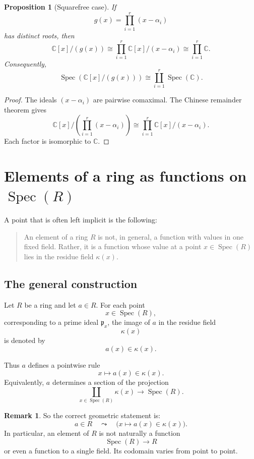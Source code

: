 \documentclass[11pt]{article}
\newtheorem{proposition}[theorem]{Proposition}
\theoremstyle{definition}
\newtheorem{remark}[theorem]{Remark}
\newcommand{\C}{\mathbb{C}}
\newcommand{\Spec}{\operatorname{Spec}}
\newcommand{\kk}[1]{\kappa\!\left(#1\right)}
\begin{document}
	\begin{proposition}[Squarefree case]\label{prop:squarefree-Cx}
		If
		\[
		g(x)=\prod_{i=1}^r (x-\alpha_i)
		\]
		has distinct roots, then
		\[
		\C[x]/(g(x))
		\cong
		\prod_{i=1}^r \C[x]/(x-\alpha_i)
		\cong
		\prod_{i=1}^r \C.
		\]
		Consequently,
		\[
		\Spec(\C[x]/(g(x)))
		\cong
		\coprod_{i=1}^r \Spec(\C).
		\]
	\end{proposition}
	
	\begin{proof}
		The ideals \((x-\alpha_i)\) are pairwise comaximal. The Chinese remainder theorem gives
		\[
		\C[x]/\left(\prod_{i=1}^r (x-\alpha_i)\right)
		\cong
		\prod_{i=1}^r \C[x]/(x-\alpha_i).
		\]
		Each factor is isomorphic to \(\C\).
	\end{proof}
	
	\section{Elements of a ring as functions on \texorpdfstring{$\Spec(R)$}{Spec(R)}}
	
	A point that is often left implicit is the following:
	
	\begin{quote}
		An element of a ring \(R\) is not, in general, a function with values in one fixed field.  
		Rather, it is a function whose value at a point \(x\in \Spec(R)\) lies in the residue field \(\kk{x}\).
	\end{quote}
	
	\subsection{The general construction}
	
	Let \(R\) be a ring and let \(a\in R\). For each point
	\[
	x\in \Spec(R),
	\]
	corresponding to a prime ideal \(\mathfrak p_x\), the image of \(a\) in the residue field
	\[
	\kk{x}
	\]
	is denoted by
	\[
	a(x)\in \kk{x}.
	\]
	
	Thus \(a\) defines a pointwise rule
	\[
	x\longmapsto a(x)\in \kk{x}.
	\]
	Equivalently, \(a\) determines a section of the projection
	\[
	\coprod_{x\in \Spec(R)} \kk{x}\longrightarrow \Spec(R).
	\]
	
	\begin{remark}
		So the correct geometric statement is:
		\[
		\boxed{
			a\in R
			\quad\leadsto\quad
			\bigl(x\mapsto a(x)\in \kk{x}\bigr).
		}
		\]
		In particular, an element of \(R\) is not naturally a function
		\[
		\Spec(R)\to R
		\]
		or even a function to a single field. Its codomain varies from point to point.
	\end{remark}
	
\end{document}
